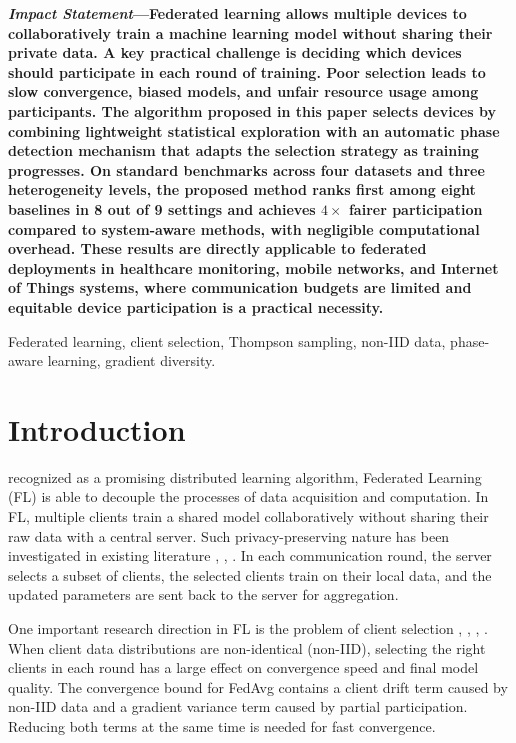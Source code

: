 \documentclass[journal]{IEEEtran}
\begin{document}
{\noindent\small\bfseries\textit{Impact Statement}---Federated learning allows multiple devices to collaboratively train a machine learning model without sharing their private data. A key practical challenge is deciding which devices should participate in each round of training. Poor selection leads to slow convergence, biased models, and unfair resource usage among participants. The algorithm proposed in this paper selects devices by combining lightweight statistical exploration with an automatic phase detection mechanism that adapts the selection strategy as training progresses. On standard benchmarks across four datasets and three heterogeneity levels, the proposed method ranks first among eight baselines in 8 out of 9 settings and achieves $4\times$ fairer participation compared to system-aware methods, with negligible computational overhead. These results are directly applicable to federated deployments in healthcare monitoring, mobile networks, and Internet of Things systems, where communication budgets are limited and equitable device participation is a practical necessity.\par}

\begin{IEEEkeywords}
Federated learning, client selection, Thompson sampling, non-IID data, phase-aware learning, gradient diversity.
\end{IEEEkeywords}

\section{Introduction}

 recognized as a promising distributed learning algorithm, Federated Learning (FL) \cite{mcmahan2017communication} is able to decouple the processes of data acquisition and computation. In FL, multiple clients train a shared model collaboratively without sharing their raw data with a central server. Such privacy-preserving nature has been investigated in existing literature \cite{kairouz2021advances}, \cite{li2020federated}, \cite{mai2024study}. In each communication round, the server selects a subset of clients, the selected clients train on their local data, and the updated parameters are sent back to the server for aggregation.

One important research direction in FL is the problem of client selection \cite{cho2022towards}, \cite{lai2021oort}, \cite{balakrishnan2022diverse}, \cite{huang2024active}. When client data distributions are non-identical (non-IID), selecting the right clients in each round has a large effect on convergence speed and final model quality. The convergence bound for FedAvg \cite{li2020federated} contains a client drift term caused by non-IID data and a gradient variance term caused by partial participation. Reducing both terms at the same time is needed for fast convergence.
\end{document}
